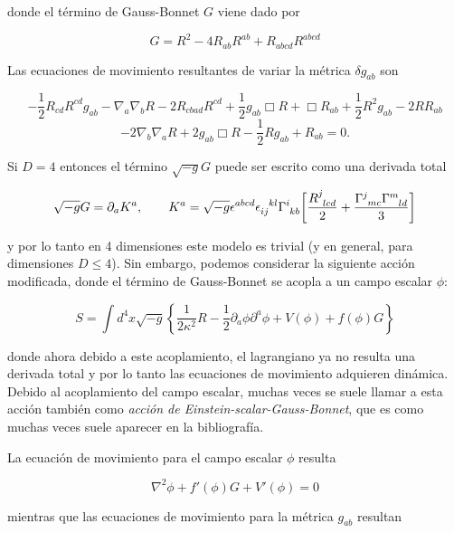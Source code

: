 donde el término de Gauss-Bonnet $G$ viene dado por 

$$
G=R^2-4R_{ab}R^{ab}+R_{abcd}R^{abcd}
$$


Las ecuaciones de movimiento resultantes de variar la métrica $\delta g_{ab}$ son

$$
-\frac{1}{2}R_{cd}R^{cd}g_{ab} - \nabla_a\nabla_bR - 2R_{cbad}R^{cd} + \frac{1}{2}g_{ab}\Box R + \Box R_{ab} + \frac{1}{2}R^{2}g_{ab} - 2RR_{ab}
$$
\begin{equation}    
-2\nabla_b\nabla_aR + 2g_{ab}\Box R -\frac{1}{2}Rg_{ab} + R_{ab}=0.
\end{equation}

Si $D=4$ entonces el término $\sqrt{-g}G$ puede ser escrito como una derivada total

\begin{equation*}
    \sqrt{-g}G=\partial_aK^a ,
    \qquad
    K^a=\sqrt{-g}\epsilon^{abcd}\tensor{\epsilon}{_{ij}^{kl}}\tensor{\Gamma}{^{i}_{kb}}\bigg[\frac{\tensor{R}{^{j}_{lcd}}}{2}+\frac{\tensor{\Gamma}{^{j}_{mc}}\tensor{\Gamma}{^{m}_{ld}}}{3}\bigg]
\end{equation*}
    
    
    
y por lo tanto en 4 dimensiones este modelo es trivial (y en general, para dimensiones $D\leq 4$). Sin embargo, podemos considerar la siguiente acción modificada, donde el término de Gauss-Bonnet se acopla a un campo escalar $\phi$:

\begin{equation*}
S=\int d^4x \sqrt{-g}\left\{ \frac{1}{2\kappa^2}R - \frac{1}{2}\partial_a\phi \partial^a\phi + V(\phi) + f(\phi)G\right\}
\end{equation*} 


donde ahora debido a este acoplamiento, el lagrangiano ya no resulta una derivada total y por lo tanto las ecuaciones de movimiento adquieren dinámica. Debido al acoplamiento del campo escalar, muchas veces se suele llamar a esta acción también como \textit{acción de Einstein-scalar-Gauss-Bonnet}, que es como muchas veces suele aparecer en la bibliografía.

La ecuación de movimiento para el campo escalar $\phi$ resulta

\begin{equation}\label{ec mov phi}
\nabla^2\phi + f'(\phi)G + V'(\phi)=0
\end{equation}

mientras que las ecuaciones de movimiento para la métrica $g_{ab}$ resultan 


